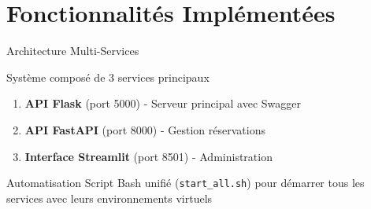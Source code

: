 \documentclass[aspectratio=169,11pt]{beamer}
\begin{document}

\section{Fonctionnalités Implémentées}

\begin{frame}{Architecture Multi-Services}
\begin{block}{Système composé de 3 services principaux}
\begin{enumerate}
    \item \textbf{API Flask} (port 5000) - Serveur principal avec Swagger
    \item \textbf{API FastAPI} (port 8000) - Gestion réservations
    \item \textbf{Interface Streamlit} (port 8501) - Administration
\end{enumerate}
\end{block}

\begin{block}{Automatisation}
Script Bash unifié (\texttt{start\_all.sh}) pour démarrer tous les services avec leurs environnements virtuels
\end{block}
\end{frame}
\end{document}
